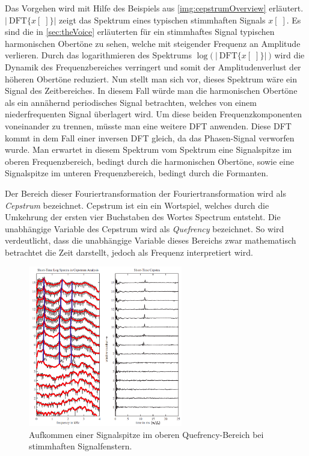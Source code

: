 Das Vorgehen wird mit Hilfe des Beispiels aus \autoref{img:cepstrumOverview} erläutert. $ |\ \text{DFT}\{x[\;]\} \big| $  zeigt das Spektrum eines \glqq typischen stimmhaften\grqq{} Signals $x[\;]$. Es sind die in \autoref{sec:theVoice} erläuterten für ein stimmhaftes Signal typischen harmonischen Obertöne zu sehen, welche mit steigender Frequenz an Amplitude verlieren. Durch das logarithmieren des Spektrums $\log \big(\ |\ \text{DFT}\{x[\;]\} |\ \big)$ wird die Dynamik des Frequenzbereiches verringert und somit der Amplitudenverlust der höheren Obertöne reduziert. Nun stellt man sich vor, dieses Spektrum wäre ein Signal des Zeitbereiches. In diesem Fall würde man die harmonischen Obertöne als ein annähernd periodisches Signal betrachten, welches von einem niederfrequenten Signal überlagert wird. Um diese beiden Frequenzkomponenten voneinander zu trennen, müsste man eine weitere DFT anwenden. Diese DFT kommt in dem Fall einer inversen DFT gleich, da das Phasen-Signal verworfen wurde. Man erwartet in diesem \glqq Spektrum vom Spektrum\grqq{} eine Signalspitze im \glqq oberen Frequenzbereich\grqq , bedingt durch die harmonischen Obertöne, sowie eine Signalspitze im \glqq unteren Frequenzbereich\grqq, bedingt durch die Formanten.\cite[\emph{Cepstral analysis}]{ricardo_ceps}

Der Bereich dieser \glqq Fouriertransformation der Fouriertransformation\grqq{} wird als \emph{Cepstrum} bezeichnet. Cepstrum ist ein ein Wortspiel, welches durch die Umkehrung der ersten vier Buchstaben des Wortes \glqq Spectrum\grqq{} entsteht. Die unabhängige Variable des Cepstrum wird als \emph{Quefrency} bezeichnet. So wird verdeutlicht, dass die unabhängige Variable dieses Bereichs zwar mathematisch betrachtet die Zeit darstellt, jedoch als Frequenz interpretiert wird.\cite[S. 7]{ricardo_ceps}

\begin{figure}[h]
	\centering
	\includegraphics[width=0.6\textwidth]{bilder/cepstrum05.png}
	\caption[Aufkommen einer Signalspitze im oberen Quefrency-Bereich]{Aufkommen einer Signalspitze im oberen Quefrency-Bereich bei stimmhaften Signalfenstern. \cite[\emph{Cepstral Analysis}, S. 17]{ricardo_ceps}}
	\label{img:cepstrumVoicedPeak}
\end{figure}	


